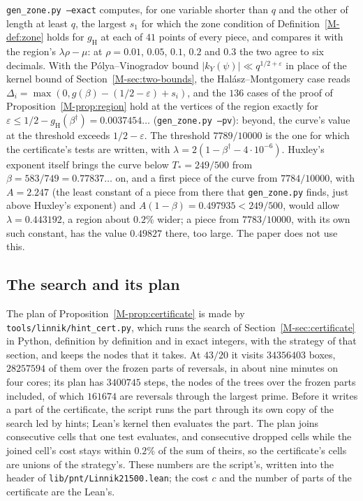 \documentclass[11pt]{article}
\newcommand{\file}[1]{\nolinkurl{#1}}
\numberwithin{equation}{section}
\begin{document}
\texttt{gen\_zone.py --exact} computes, for one variable shorter than $q$ and the other of length at least $q$, the
largest $s_1$ for which the zone condition of Definition~\ref{M-def:zone} holds for $g_{\mathrm H}$ at each of $41$
points of every piece, and compares it with the region's $\lambda\rho - \mu$: at $\rho = 0.01$, $0.05$, $0.1$, $0.2$ and
$0.3$ the two agree to six decimals. With the Pólya--Vinogradov bound $|k_Y(\psi)| \ll q^{1/2 + \varepsilon}$ in place
of the kernel bound of Section~\ref{M-sec:two-bounds}, the Hal\'asz--Montgomery case reads $\Delta_i = \max(0,
g(\beta) - (1/2 - \varepsilon) + s_i)$, and
the $136$ cases of the proof of Proposition~\ref{M-prop:region} hold at the vertices of the region exactly for
$\varepsilon \le 1/2 - g_{\mathrm H}(\beta^\dagger) = 0.0037454\ldots$ (\texttt{gen\_zone.py --pv}): beyond, the curve's
value at the threshold exceeds $1/2 - \varepsilon$. The threshold $7789/10000$ is the one for which the certificate's
tests are written, with $\lambda = 2(1 - \beta^\dagger - 4 \cdot 10^{-6})$. Huxley's exponent itself brings the curve
below
$T_* = 249/500$ from $\beta = 583/749 = 0.77837\ldots$ on, and a first piece of the curve from $7784/10000$, with
$A = 2.247$ (the least constant of a piece from there that \texttt{gen\_zone.py} finds, just above Huxley's exponent)
and $A(1 - \beta) = 0.497935 < 249/500$, would allow $\lambda = 0.443192$, a region about $0.2\%$ wider; a piece from
$7783/10000$, with its own such constant, has the value $0.49827$ there, too large. The paper does not use this.

\subsection*{The search and its plan}

The plan of Proposition~\ref{M-prop:certificate} is made by \file{tools/linnik/hint\_cert.py}, which runs the search of
Section~\ref{M-sec:certificate} in Python, definition by definition and in exact integers, with the strategy of that
section, and keeps the nodes that it takes. At $43/20$ it visits $34356403$ boxes, $28257594$ of them over the frozen
parts of reversals, in about nine minutes on four cores; its plan has $3400745$ steps, the nodes of the trees over the
frozen parts included, of which $161674$ are reversals through the largest prime. Before it writes a part of the
certificate, the script runs the part through its own copy of the search led by hints; Lean's kernel then evaluates
the part. The plan joins consecutive cells that one test evaluates, and consecutive dropped cells while the
joined cell's cost stays within $0.2\%$ of the sum of theirs, so the certificate's cells are unions of the strategy's.
These numbers are the script's, written into the header of \file{lib/pnt/Linnik21500.lean}; the cost $c$ and the
number of parts of the certificate are the Lean's.
\end{document}
